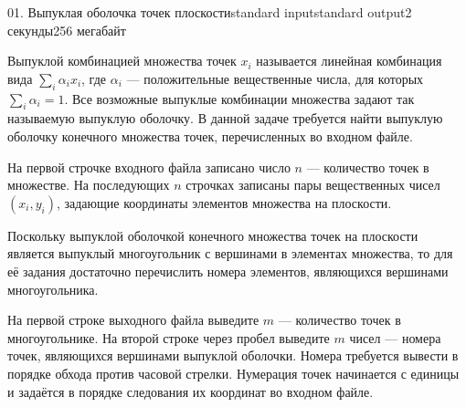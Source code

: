 \begin{problem}{01. Выпуклая оболочка точек плоскости}{standard input}{standard output}{2 секунды}{256 мегабайт}

Выпуклой комбинацией множества точек $x_i$ называется линейная комбинация вида $\sum_i \alpha_i x_i$, где $\alpha_i$ — положительные вещественные числа, для которых $\sum_i \alpha_i = 1$. Все возможные выпуклые комбинации множества задают так называемую выпуклую оболочку. В данной задаче требуется найти выпуклую оболочку конечного множества точек, перечисленных во входном файле.

\InputFile

На первой строчке входного файла записано число $n$ — количество точек в множестве. На последующих $n$ строчках записаны пары вещественных чисел $(x_i, y_i)$, задающие координаты элементов множества на плоскости.

\OutputFile

Поскольку выпуклой оболочкой конечного множества точек на плоскости является выпуклый многоугольник с вершинами в элементах множества, то для её задания достаточно перечислить номера элементов, являющихся вершинами многоугольника.

На первой строке выходного файла выведите $m$ — количество точек в многоугольнике. На второй строке через пробел выведите $m$ чисел — номера точек, являющихся вершинами выпуклой оболочки. Номера требуется вывести в порядке обхода против часовой стрелки. Нумерация точек начинается с единицы и задаётся в порядке следования их координат во входном файле.

\Examples

\begin{example}%
%
\end{example}

\end{problem}
